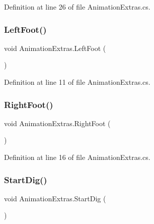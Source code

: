 Definition at line 26 of file Animation\+Extras.\+cs.

\mbox{\label{class_animation_extras_a5c2b33e665c2ffcd4616fee7b4e74fcc}} 
\subsubsection{\texorpdfstring{Left\+Foot()}{LeftFoot()}}
{\footnotesize\ttfamily void Animation\+Extras.\+Left\+Foot (\begin{DoxyParamCaption}{ }\end{DoxyParamCaption})}



Definition at line 11 of file Animation\+Extras.\+cs.

\mbox{\label{class_animation_extras_a698a00e06adf4adcb7ad80a47166c6f5}} 
\subsubsection{\texorpdfstring{Right\+Foot()}{RightFoot()}}
{\footnotesize\ttfamily void Animation\+Extras.\+Right\+Foot (\begin{DoxyParamCaption}{ }\end{DoxyParamCaption})}



Definition at line 16 of file Animation\+Extras.\+cs.

\mbox{\label{class_animation_extras_a33e63f21f3d2269719479493e9b29001}} 
\subsubsection{\texorpdfstring{Start\+Dig()}{StartDig()}}
{\footnotesize\ttfamily void Animation\+Extras.\+Start\+Dig (\begin{DoxyParamCaption}{ }\end{DoxyParamCaption})}



